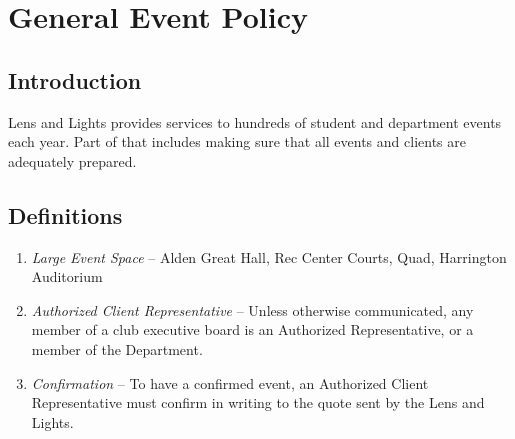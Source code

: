 \chapter{General Event Policy}

\section{Introduction}
Lens and Lights provides services to hundreds of student and department events
each year. Part of that includes making sure that all events and clients are
adequately prepared.

\section{Definitions}
\begin{enumerate}
    \item \emph{Large Event Space} -- Alden Great Hall, Rec Center Courts, Quad,
        Harrington Auditorium
    \item \emph{Authorized Client Representative} -- Unless otherwise
        communicated, any member of a club executive board is an Authorized
        Representative, or a member of the Department.
    \item \emph{Confirmation} -- To have a confirmed event, an Authorized Client
        Representative must confirm in writing to the quote sent by the Lens and
        Lights.
\end{enumerate}

